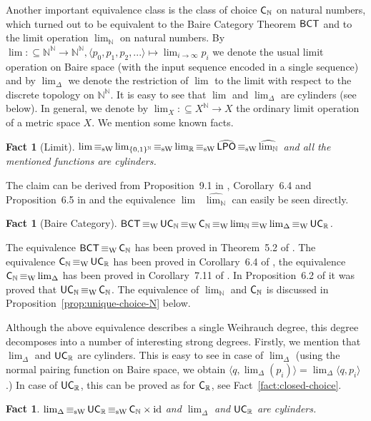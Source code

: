 \documentclass[a4paper]{amsart}
\def\IN{{\mathbb{N}}}
\def\IR{{\mathbb{R}}}
\def\In{\subseteq}
\def\id{{\rm id}}
\def\Baire{{\IN^\IN}}
\def\LPO{\text{\rm\sffamily LPO}}
\def\BCT{\text{\rm\sffamily BCT}}
\def\C{\mbox{\rm\sffamily C}}
\def\UC{\mbox{\rm\sffamily UC}}
\def\LPO{\mbox{\rm\sffamily LPO}}
\def\equivW{\mathop{\equiv_{\mathrm{W}}}}
\def\equivSW{\mathop{\equiv_{\mathrm{sW}}}}
\newtheorem{fact}[theorem]{Fact}
\theoremstyle{definition}
\begin{document}
Another important equivalence class is the class of choice $\C_\IN$ on natural numbers, which turned
out to be equivalent to the Baire Category Theorem $\BCT$ and to the limit operation $\lim_\IN$ on natural 
numbers. By $\lim:\In\Baire\to\Baire,\langle p_0,p_1,p_2,...\rangle\mapsto\lim_{i\to\infty}p_i$ we denote the usual
limit operation on Baire space (with the input sequence encoded in a single sequence) and by $\lim_\Delta$ we denote
the restriction of $\lim$ to the limit with respect to the discrete topology on $\Baire$. 
It is easy to see that $\lim$ and $\lim_\Delta$ are cylinders (see below).
In general, we denote by $\lim_X:\In X^\IN\to X$ the ordinary limit operation of a metric space $X$.
We mention some known facts.

\begin{fact}[Limit]
\label{fact:lim}
$\lim\equivSW\lim_{\{0,1\}^\IN}\equivSW\lim_\IR\equivSW\widehat{\LPO}\equivSW\widehat{\lim_\IN}$
and all the mentioned functions are cylinders.
\end{fact}

The claim can be derived from Proposition~9.1 in \cite{Bra05}, Corollary~6.4 and Proposition~6.5 in \cite{BG11}
and the equivalence $\lim\equivSW\widehat{\lim_\IN}$ can easily be seen directly.

\begin{fact}[Baire Category]
\label{fact:BCT}
$\BCT\equivW\UC_\IN\equivW\C_\IN\equivW\lim_\IN\equivW\lim_\Delta\equivW\UC_\IR$.
\end{fact}

The equivalence $\BCT\equivW\C_\IN$ has been proved in Theorem~5.2 of \cite{BG11a}.
The equivalence $\C_\IN\equivW\UC_\IR$ has been proved in Corollary~6.4 of \cite{BBP},
the equivalence $\C_\IN\equivW\lim_\Delta$ has been proved in Corollary~7.11 of \cite{BBP}.
In Proposition~6.2 of \cite{BBP} it was proved that $\UC_\IN\equivW\C_\IN$. 
The equivalence of $\lim_\IN$ and $\C_\IN$ is discussed in Proposition~\ref{prop:unique-choice-N} below.

Although the above equivalence describes a single Weihrauch degree, this degree decomposes
into a number of interesting strong degrees.
Firstly, we mention that $\lim_\Delta$ and $\UC_\IR$ are cylinders.
This is easy to see in case of $\lim_\Delta$ (using the normal pairing function
on Baire space, we obtain $\langle q,\lim_\Delta(p_i)\rangle=\lim_\Delta\langle q,p_i\rangle$.)
In case of $\UC_\IR$, this can be proved as for $\C_\IR$, see Fact~\ref{fact:closed-choice}.

\begin{fact}
\label{fact:lim-delta-UCR}
$\lim_\Delta\equivSW\UC_\IR\equivSW\C_\IN\times\id$ and $\lim_\Delta$ and $\UC_\IR$ are cylinders.
\end{fact}
\end{document}
